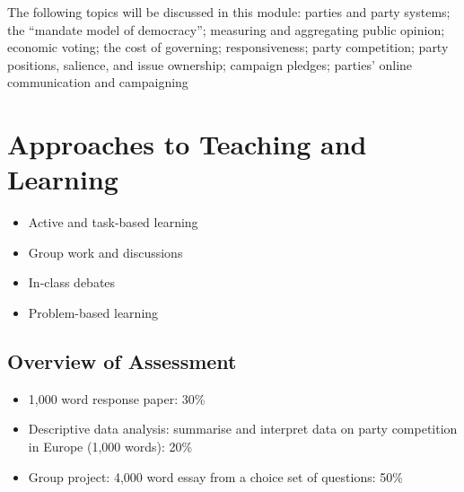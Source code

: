 \documentclass[abstract=on,parskip=full,headings=standardclasses,fontsize=11pt,paper=a4]{scrartcl}
\begin{document}
The following topics will be discussed in this module: parties and party systems; the ``mandate model of democracy''; measuring and aggregating public opinion; economic voting; the cost of governing; responsiveness; party competition; party positions, salience, and issue ownership; campaign pledges; parties' online communication and campaigning

\section*{Approaches to Teaching and Learning}

\begin{itemize}
\item Active and task-based learning
\item Group work and discussions
\item In-class debates
\item Problem-based learning
\end{itemize}






\subsection*{Overview of Assessment}

\begin{itemize}
\item 1,000 word response paper: 30\% 
\item Descriptive data analysis: summarise and interpret data on party competition in Europe (1,000 words): 20\%
\item Group project: 4,000 word essay from a choice set of questions: 50\%
\end{itemize}
\end{document}
